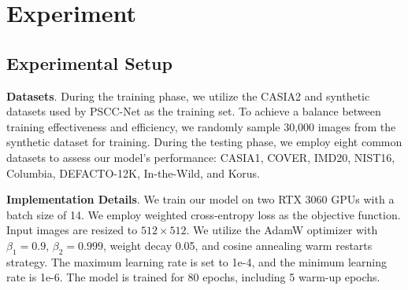 \documentclass{article}
\begin{document}
\section{Experiment}

\subsection{Experimental Setup}
\textbf{Datasets}. During the training phase, we utilize the CASIA2\cite{CASIA2} and synthetic datasets used by PSCC-Net\cite{PSCC} as the training set. To achieve a balance between training effectiveness and efficiency, we randomly sample 30,000 images from the synthetic dataset for training. During the testing phase, we employ eight common datasets to assess our model's performance: CASIA1\cite{CASIA1}, COVER\cite{COVER}, IMD20\cite{IMD20}, NIST16\cite{NIST16}, Columbia\cite{Columbia}, DEFACTO-12K\cite{DEFACTO-12K}, In-the-Wild\cite{In-the-Wild}, and Korus\cite{Korus}. 


\noindent\textbf{Implementation Details}. We train our model on two RTX 3060 GPUs with a batch size of 14. We employ weighted cross-entropy loss as the objective function. Input images are resized to $512\times 512$. We utilize the AdamW optimizer with $\beta_1 = 0.9$, $\beta_2 = 0.999$, weight decay 0.05, and cosine annealing warm restarts strategy. The maximum learning rate is set to 1e-4, and the minimum learning rate is 1e-6. The model is trained for 80 epochs, including 5 warm-up epochs. 
\end{document}
